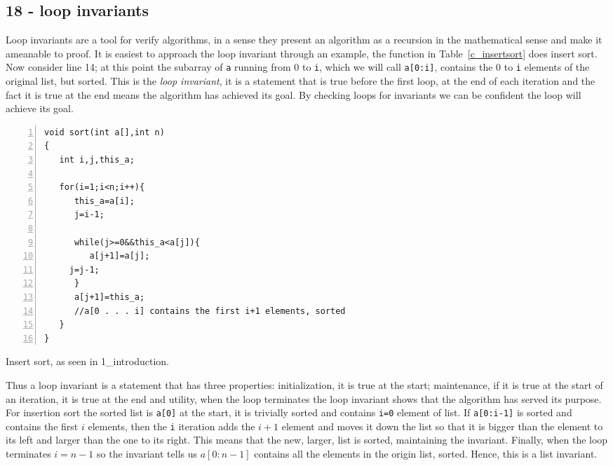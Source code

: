 \documentclass[11pt,a4paper]{scrartcl}
\begin{document}
\subsection*{18 - loop invariants}

Loop invariants are a tool for verify algorithms, in a sense they
present an algorithm as a recursion in the mathematical sense and make
it ameanable to proof. It is easiest to approach the loop invariant
through an example, the function in Table~\ref{c_insertsort} does
insert sort. Now consider line 14; at this point the subarray of
\texttt{a} running from 0 to \texttt{i}, which we will call
\texttt{a[0:i]}, contains the 0 to \texttt{i} elements of the original
list, but sorted. This is the \textsl{loop invariant}, it is a
statement that is true before the first loop, at the end of each
iteration and the fact it is true at the end means the algorithm has
achieved its goal. By checking loops for invariants we can be
confident the loop will achieve its goal.

\begin{table}
\begin{lstlisting}[numbers=left]
void sort(int a[],int n)
{
   int i,j,this_a;

   for(i=1;i<n;i++){
      this_a=a[i];
      j=i-1;

      while(j>=0&&this_a<a[j]){
         a[j+1]=a[j];
	 j=j-1;
      }
      a[j+1]=this_a;
      //a[0 . . . i] contains the first i+1 elements, sorted
   }
}
\end{lstlisting}
\caption{Insert sort, as seen in 1\_introduction.\label{c_insertsort}}
\end{table}

Thus a loop invariant is a statement that has three properties:
initialization, it is true at the start; maintenance, if it is true at
the start of an iteration, it is true at the end and utility, when the
loop terminates the loop invariant shows that the algorithm has served
its purpose. For insertion sort the sorted list is \texttt{a[0]} at
the start, it is trivially sorted and contains \texttt{i=0} element of
list. If \texttt{a[0:i-1]} is sorted and contains the first $i$
elements, then the \texttt{i} iteration adds the $i+1$ element and
moves it down the list so that it is bigger than the element to its
left and larger than the one to its right. This means that the new,
larger, list is sorted, maintaining the invariant. Finally, when the
loop terminates $i=n-1$ so the invariant tells us $a[0:n-1]$ contains
all the elements in the origin list, sorted. Hence, this is a list
invariant.
\end{document}
